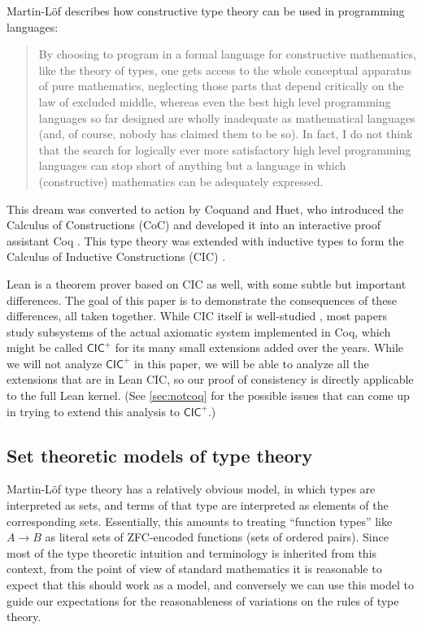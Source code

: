 Martin-L\"{o}f describes how constructive type theory can be used in programming languages:
\begin{quote}
By choosing to program in a formal language for constructive mathematics, like the theory of types, one gets access to the whole conceptual apparatus of pure mathematics, neglecting those parts that depend critically on the law of excluded middle, whereas even the best high level programming languages so far designed are wholly inadequate as mathematical languages (and, of course, nobody has claimed them to be so). In fact, I do not think that the search for logically ever more satisfactory high level programming languages can stop short of anything but a language in which (constructive) mathematics can be adequately expressed. \cite{martinlofprog}
\end{quote}

This dream was converted to action by Coquand and Huet, who introduced the Calculus of Constructions (\textsf{CoC}) \cite{coquandcoc} and developed it into an interactive proof assistant \textsf{Coq} \cite{coqart}. This type theory was extended with inductive types \cite{dybjer} to form the Calculus of Inductive Constructions (\textsf{CIC}) \cite{paulincic}.

Lean \cite{demoura} is a theorem prover based on \textsf{CIC} as well, with some subtle but important differences. The goal of this paper is to demonstrate the consequences of these differences, all taken together. While \textsf{CIC} itself is well-studied \cite{barrassets, barrastypedec, coqincoq}, most papers study subsystems of the actual axiomatic system implemented in Coq, which might be called $\mathsf{CIC^+}$ for its many small extensions added over the years. While we will not analyze $\mathsf{CIC^+}$ in this paper, we will be able to analyze all the extensions that are in Lean \textsf{CIC}, so our proof of consistency is directly applicable to the full Lean kernel. (See \autoref{sec:notcoq} for the possible issues that can come up in trying to extend this analysis to $\mathsf{CIC^+}$.)

\subsection{Set theoretic models of type theory}
Martin-L\"{o}f type theory has a relatively obvious model, in which types are interpreted as sets, and terms of that type are interpreted as elements of the corresponding sets. Essentially, this amounts to treating ``function types'' like $A\to B$ as literal sets of ZFC-encoded functions (sets of ordered pairs). Since most of the type theoretic intuition and terminology is inherited from this context, from the point of view of standard mathematics it is reasonable to expect that this should work as a model, and conversely we can use this model to guide our expectations for the reasonableness of variations on the rules of type theory.

